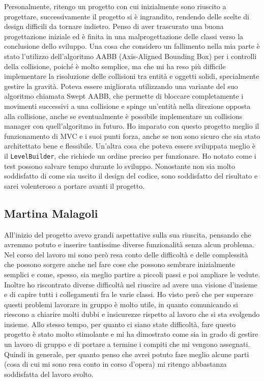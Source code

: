 \documentclass[a4paper,12pt]{report}
\begin{document}
Personalmente, ritengo un progetto con cui inizialmente sono riuscito a progettare, successivamente il progetto si è ingrandito, rendendo delle scelte di design difficili da tornare indietro. Penso di aver trascurato una buona progettazione iniziale ed è finita in una malprogettazione delle classi verso la conclusione dello sviluppo. Una cosa che considero un fallimento nella mia parte è stato l'utilizzo dell'algoritmo AABB (Axis-Aligned Bounding Box) per i controlli della collisione, poiché è molto semplice, ma che mi ha reso più difficile implementare la risoluzione delle collisioni tra entità e oggetti solidi, specialmente gestire la gravità. Poteva essere migliorata utilizzando una variante del suo algoritmo chiamata Swept AABB, che permette di bloccare completamente i movimenti successivi a una collisione e spinge un'entità nella direzione opposta alla collisione, anche se eventualmente è possibile implementare un collisions manager con quell'algoritmo in futuro. Ho imparato con questo progetto meglio il funzionamento di MVC e i suoi punti forza, anche se non sono sicuro che sia stato architettato bene e flessibile. Un'altra cosa che poteva essere sviluppata meglio è il \texttt{LevelBuilder}, che richiede un ordine preciso per funzionare. Ho notato come i test possono salvare tempo durante lo sviluppo.
Nonostante non sia molto soddisfatto di come sia uscito il design del codice, sono soddisfatto del risultato e sarei volenteroso a portare avanti il progetto.

\subsection{Martina Malagoli}

All'inizio del progetto avevo grandi aspettative sulla sua riuscita, pensando che avremmo potuto e inserire tantissime diverse funzionalità senza alcun problema. Nel corso del lavoro mi sono però resa conto delle difficoltà e delle complessità che possono sorgere anche nel fare cose che possono sembrare inizialmente semplici e come, spesso, sia meglio partire a piccoli passi e poi ampliare le vedute. 
Inoltre ho riscontrato diverse difficoltà nel riuscire ad avere una visione d'insieme e di capire tutti i collegamenti fra le varie classi. 
Ho visto però che per superare questi problemi lavorare in gruppo è molto utile, in quanto comunicando si riescono a chiarire molti dubbi e insicurezze rispetto al lavoro che si sta svolgendo insieme.
Allo stesso tempo, per quanto ci siano state difficoltà, fare questo progetto è stato molto stimolante e mi ha dimostrato come sia in grado di gestire un lavoro di gruppo e di portare a termine i compiti che mi vengono assegnati.
Quindi in generale, per quanto penso che avrei potuto fare meglio alcune parti (cosa di cui mi sono resa conto in corso d'opera) mi ritengo abbastanza soddisfatta del lavoro svolto.
\end{document}
